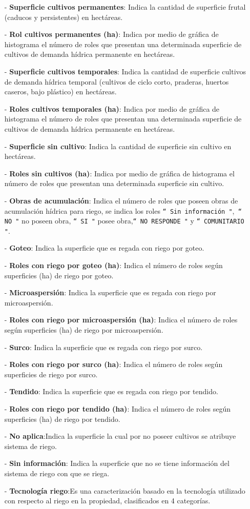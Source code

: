 \documentclass[10pt]{article}
\begin{document}
\begin{itemize}
 \item[-]\textbf{Superficie cultivos permanentes}: Indica la cantidad de superficie frutal (caducos y persistentes) en hectáreas.
 \item[-]\textbf{Rol cultivos permanentes (ha)}: Indica por medio de gráfica de histograma el número de roles que presentan una determinada superficie de cultivos de demanda hídrica permanente en hectáreas.
 \item[-]\textbf{Superficie cultivos temporales}: Indica la cantidad de superficie cultivos de demanda hídrica temporal (cultivos de ciclo corto, praderas, huertos caseros, bajo plástico) en hectáreas.
 \item[-]\textbf{Roles cultivos temporales (ha)}: Indica por medio de gráfica de histograma el número de roles que presentan una determinada superficie de cultivos de demanda hídrica permanente en hectáreas.
 \item[-]\textbf{Superficie sin cultivo}: Indica la cantidad de superficie sin cultivo en hectáreas.
 \item[-]\textbf{Roles sin cultivos (ha)}: Indica por medio de gráfica de histograma el número de roles que presentan una determinada superficie sin cultivo.
 \item[-]\textbf{Obras de acumulación}: Indica el número de roles que poseen obras de acumulación hídrica para riego, se indica los roles \texttt{“ Sin información "},\texttt{ “ NO "} no poseen obra, \texttt{“ SI "} posee obra,\texttt{“ NO RESPONDE "} y \texttt{“ COMUNITARIO "}. 
\item[-]\textbf{Goteo}: Indica la superficie que es regada con riego por goteo.
\item[-]\textbf{Roles con riego por goteo (ha)}: Indica el número de roles según superficies (ha) de riego por goteo. 
\item[-]\textbf{Microaspersión}: Indica la superficie que es regada con riego por microaspersión.
\item[-]\textbf{Roles con riego por microaspersión (ha)}: Indica el número de roles según superficies (ha) de riego por microaspersión. 
\item[-]\textbf{Surco}: Indica la superficie que es regada con riego por surco.
\item[-]\textbf{Roles con riego por surco (ha)}: Indica el número de roles según superficies de riego por surco.
\item[-]\textbf{Tendido}: Indica la superficie que es regada con riego por tendido.
\item[-]\textbf{Roles con riego por tendido (ha)}: Indica el número de roles según superficies (ha) de riego por tendido.
\item[-]\textbf{No aplica}:Indica la superficie la cual por no poseer cultivos se atribuye sistema de riego.
\item[-]\textbf{Sin información}: Indica la superficie que no se tiene información del sistema de riego con que se riega.
\item[-]\textbf{Tecnología riego}:Es una caracterización basado en la tecnología utilizado con respecto al riego en la propiedad, clasificados en 4 categorías. 


\end{itemize}
\end{document}
